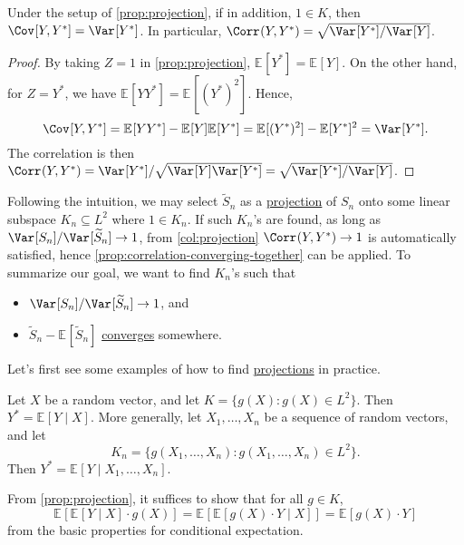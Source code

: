 \begin{corollary}\label{col:projection}
	Under the setup of \autoref{prop:projection}, if in addition, \(1 \in K\), then \(\Cov_{}[Y, Y^{\ast} ] = \Var_{}[Y^{\ast} ] \). In particular, \(\Corr_{}(Y, Y^{\ast} ) = \sqrt{\Var_{}[Y^{\ast} ] / \Var_{}[Y] } \).
\end{corollary}
\begin{proof}
	By taking \(Z = 1\) in \autoref{prop:projection}, \(\mathbb{E}_{}[Y^{\ast} ] = \mathbb{E}_{}[Y] \). On the other hand, for \(Z = Y^{\ast} \), we have \(\mathbb{E}_{}[Y Y^{\ast} ] = \mathbb{E}_{}[(Y^{\ast} )^2] \). Hence,
	\[
		\Cov_{}[Y, Y^{\ast} ]
		= \mathbb{E}_{}[Y Y^{\ast} ] - \mathbb{E}_{}[Y] \mathbb{E}_{}[Y^{\ast} ]
		= \mathbb{E}_{}[(Y^{\ast} )^2] - \mathbb{E}_{}[Y^{\ast} ] ^2
		= \Var_{}[Y^{\ast} ].
	\]
	The correlation is then \(\Corr_{}(Y, Y^{\ast} ) = \Var_{}[Y^{\ast} ] / \sqrt{\Var_{}[Y] \Var_{}[Y^{\ast} ] } = \sqrt{\Var_{}[Y^{\ast} ] / \Var_{}[Y] }\).
\end{proof}

Following the intuition, we may select \(\widetilde{S} _n\) as a \hyperref[def:projection]{projection} of \(S_n\) onto some linear subspace \(K_n \subseteq L^2\) where \(1 \in K_n\). If such \(K_n\)'s are found, as long as \(\Var_{}[S_n] / \Var_{}[\widetilde{S} _n] \to 1\), from \autoref{col:projection} \(\Corr_{}(Y, Y^{\ast} ) \to 1\) is automatically satisfied, hence \autoref{prop:correlation-converging-together} can be applied. To summarize our goal, we want to find \(K_n\)'s such that
\begin{itemize}
	\item \(\Var_{}[S_n] / \Var_{}[\widetilde{S} _n] \to 1\), and
	\item \(\widetilde{S} _n - \mathbb{E}_{}[\widetilde{S} _n] \) \hyperref[def:converge-in-distribution]{converges} somewhere.
\end{itemize}

Let's first see some examples of how to find \hyperref[def:projection]{projections} in practice.

\begin{eg}
	Let \(X\) be a random vector, and let \(K = \{ g(X) \colon g(X) \in L^2 \} \). Then \(Y^{\ast} = \mathbb{E}_{}[Y \mid X] \). More generally, let \(X_1, \dots , X_n\) be a sequence of random vectors, and let
	\[
		K_n = \{ g(X_1, \dots , X_n) \colon g(X_1, \dots , X_n) \in L^2\}.
	\]
	Then \(Y^{\ast} = \mathbb{E}_{}[Y \mid X_1, \dots , X_n] \).
\end{eg}
\begin{explanation}
	From \autoref{prop:projection}, it suffices to show that for all \(g \in K\),
	\[
		\mathbb{E}_{}[\mathbb{E}_{}[Y \mid X] \cdot g(X)]
		= \mathbb{E}_{}[\mathbb{E}_{}[g(X) \cdot Y \mid X] ]
		= \mathbb{E}_{}[g(X) \cdot Y]
	\]
	from the basic properties for conditional expectation.
\end{explanation}

